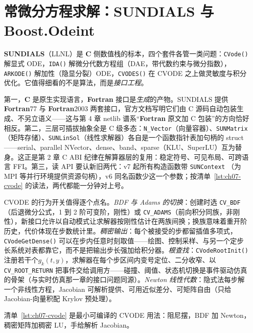 \documentclass[12pt,a4paper,fontset=fandol]{ctexbook}
\newcommand{\Fn}[1]{\texttt{#1()}}
\newcommand{\Tp}[1]{\texttt{#1}}
\newcommand{\Bk}{\allowbreak}
\newcommand{\Lib}[1]{\textbf{#1}}
\newcommand{\Lang}[1]{\textsf{\bfseries #1}}
\newcommand{\CL}{\Lang{C}}
\newcommand{\FTN}{\Lang{Fortran}}
\begin{document}
\section{常微分方程求解：SUNDIALS 与 Boost.Odeint}\label{sec:ch07-ode}

\Lib{SUNDIALS}（LLNL）是 \CL{} 侧数值栈的标本，四个套件各管一类问题：\Fn{CVode} 解显式 ODE，\Fn{IDA} 解微分代数方程组（DAE，带代数约束与微分指数），\Fn{ARKODE} 解加性（隐显分裂）ODE，\Fn{CVODES} 在 CVODE 之上做灵敏度与积分优化。它值得细看的不是算法，而是\emph{接口工程}。

第一，\CL{} 是原生实现语言，\FTN{} 接口是\emph{生成}的产物。SUNDIALS 提供 \FTN{77} 与 \FTN{2003} 两套接口，官方文档写明它们由 C 源码自动包装生成、不另立语义——这与第 4 章 netlib 谱系``\FTN{} 原文加 C 包装''的方向恰好相反。第二，三层可插拔抽象全是 C 级多态：\Tp{N\_Vector}（向量容器）、\Tp{SUNMatrix}（矩阵存储）、\Tp{SUNLinSol}（线性求解器）各自是一个函数指针表加句柄的 struct——serial、parallel NVector、dense、band、sparse（KLU、SuperLU）互为替身。这正是第 2 章 C ABI 纪律在解算器层的复用：稳定符号、可见布局、可跨语言 FFI。第三，读 API 要认新旧两代：v7 起所有构造函数带 \Tp{SUNContext} \Bk{}（为 MPI 等并行环境提供资源句柄），v6 同名函数少这一个参数；按清单~\ref{lst:ch07-cvode} 的读法，两代都能一分钟对上号。

CVODE 的行为开关值得逐个点名。\emph{BDF 与 Adams 的切换}：创建时选 \Tp{CV\_BDF}（后退微分公式，1 到 2 阶可变阶，刚性）或 \Tp{CV\_ADAMS}（前向积分同族，非刚性），新接口允许以自动模式让求解器按刚性估计在两族间换；换族意味着重开阶历史，代价体现在步数统计里。\emph{稠密输出}：每个被接受的步都留插值多项式，\Fn{CVodeGetDense} 可以在步内任意时刻取值——绘图、控制采样、与另一个定步长系统对表都靠它，而不是把输出步长强加给积分器。\emph{根查找}：\Fn{CVodeRootInit} 注册若干个$g_k(t,y)$，求解器在每个步区间内变号定位、二分收窄、以 \Tp{CV\_ROOT\_RETURN} \Bk{} 把事件交给调用方——碰撞、阈值、状态机切换是事件驱动仿真的骨架（与实时仿真那一章的接口问题同源）。\emph{Newton 线性代数}：隐式法每步解一个非线性方程，Jacobian 可解析提供、可用近似差分、可矩阵自由（只给 Jacobian-向量积配 Krylov 预处理）。

清单~\ref{lst:ch07-cvode} 是最小可编译的 CVODE 用法：阻尼摆，BDF 加 Newton，稠密矩阵加稠密 LU，手给解析 Jacobian。
\end{document}
